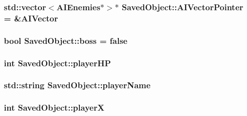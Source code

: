 \subsubsection[{\texorpdfstring{A\+I\+Vector\+Pointer}{AIVectorPointer}}]{\setlength{\rightskip}{0pt plus 5cm}std\+::vector$<${\bf A\+I\+Enemies}$\ast$$>$$\ast$ Saved\+Object\+::\+A\+I\+Vector\+Pointer = \&{\bf A\+I\+Vector}\hspace{0.3cm}{\ttfamily [protected]}}\hypertarget{classSavedObject_accf95b77c451762f450243c1ad8fd4fb}{}\label{classSavedObject_accf95b77c451762f450243c1ad8fd4fb}
\subsubsection[{\texorpdfstring{boss}{boss}}]{\setlength{\rightskip}{0pt plus 5cm}bool Saved\+Object\+::boss = false\hspace{0.3cm}{\ttfamily [protected]}}\hypertarget{classSavedObject_ae1a2ed176b180bb0150d369baa59c75e}{}\label{classSavedObject_ae1a2ed176b180bb0150d369baa59c75e}
\subsubsection[{\texorpdfstring{player\+HP}{playerHP}}]{\setlength{\rightskip}{0pt plus 5cm}int Saved\+Object\+::player\+HP\hspace{0.3cm}{\ttfamily [protected]}}\hypertarget{classSavedObject_ae5c232fb5f33802a8d21ddb9efd012df}{}\label{classSavedObject_ae5c232fb5f33802a8d21ddb9efd012df}
\subsubsection[{\texorpdfstring{player\+Name}{playerName}}]{\setlength{\rightskip}{0pt plus 5cm}std\+::string Saved\+Object\+::player\+Name\hspace{0.3cm}{\ttfamily [protected]}}\hypertarget{classSavedObject_a987da946a257bc193b405e7e0ce268ed}{}\label{classSavedObject_a987da946a257bc193b405e7e0ce268ed}
\subsubsection[{\texorpdfstring{playerX}{playerX}}]{\setlength{\rightskip}{0pt plus 5cm}int Saved\+Object\+::playerX\hspace{0.3cm}{\ttfamily [protected]}}\hypertarget{classSavedObject_a11bf4551c0b43d3b3eda2ed152b30fea}{}\label{classSavedObject_a11bf4551c0b43d3b3eda2ed152b30fea}
